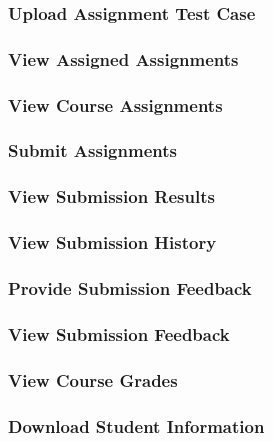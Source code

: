 \documentclass{article}
\begin{document}
\subsubsection{Upload Assignment Test Case}



\subsubsection{View Assigned Assignments}

\subsubsection{View Course Assignments}


\subsubsection{Submit Assignments}


\subsubsection{View Submission Results}

\subsubsection{View Submission History}

\subsubsection{Provide Submission Feedback}

\subsubsection{View Submission Feedback}

\subsubsection{View Course Grades}



\subsubsection{Download Student Information}
\end{document}
